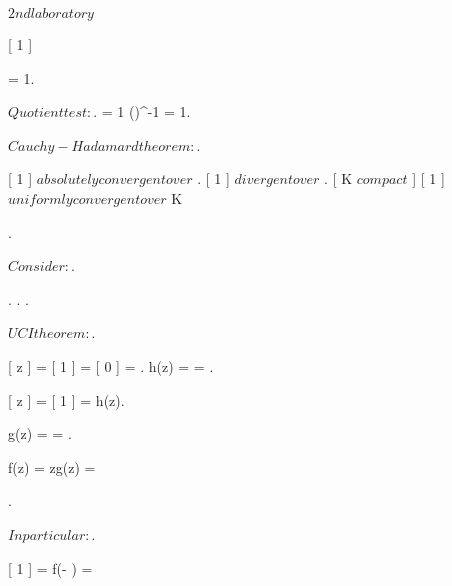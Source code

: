 \documentclass[../Main/main]{subfiles}
\begin{document}
\renewcommand{\blockName}{ Martin Azpillaga Aldalur }

\unit{ $ 2nd laboratory $ }
{
	{
		\study
		{
			[ 1 ]
		}
		\start
		{
			{
				 = 1.

				$Quotient test:$.
				 = 1 \imp \left(\right)^{-1} = 1. 

				$Cauchy-Hadamard theorem:$.

				[ 1 ] $ absolutely convergent over $ \D.
				[ 1 ] $ divergent  over $ \C \setminus \closed{\D}.
				[ K $ compact $ ]
				{
					[ 1 ] $ uniformly convergent over $  K
				}
				
			}.


			{
				$Consider:$.

				.
				.
				.

				$UCI theorem:$.

				{
					[ z ] =  [ 1 ] = [ 0 ] = .
					h(z) =  = .

					[ z ] = [ 1 ] = h(z).

					g(z) =  = .

					f(z) = zg(z) = 
				}

				
			}.


			{
				$In particular:$.

				[ 1 ] = f(- ) = 
			}
		}
	}
	
}
\end{document}
